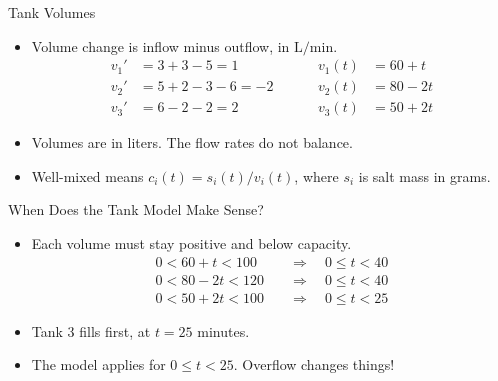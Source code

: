 \begin{frame}{Tank Volumes}
\begin{itemize}
  \item Volume change is inflow minus outflow, in $\mathrm{L/min}$.
  \[
  \begin{aligned}
    v_1'&=3+3-5=1 & \hspace{1cm}v_1(t)&=60+t\\
    v_2'&=5+2-3-6=-2 & \hspace{1cm}v_2(t)&=80-2t\\
    v_3'&=6-2-2=2 & \hspace{1cm}v_3(t)&=50+2t
  \end{aligned}
  \]
  \item Volumes are in liters. The flow rates do not balance.
  \item Well-mixed means $c_i(t)=s_i(t)/v_i(t)$, where $s_i$ is salt mass in grams.
\end{itemize}
\end{frame}

\begin{frame}{When Does the Tank Model Make Sense?}
\begin{itemize}
  \item Each volume must stay positive and below capacity.
  \[
  \begin{aligned}
    0<60+t<100&\quad\Longrightarrow\quad 0\leq t<40\\
    0<80-2t<120&\quad\Longrightarrow\quad 0\leq t<40\\
    0<50+2t<100&\quad\Longrightarrow\quad 0\leq t<25
  \end{aligned}
  \]
  \item Tank 3 fills first, at $t=25$ minutes.
  \item The model applies for $0\leq t<25$. Overflow changes things!
\end{itemize}
\end{frame}

